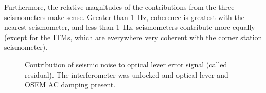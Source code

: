 Furthermore, the relative magnitudes of the contributions from the
three seismometers make sense. Greater than 1~Hz, coherence is
greatest with the nearest seismometer, and less than 1~Hz,
seismometers contribute more equally (except for the ITMs, which are
everywhere very coherent with the corner station seismometer).

\begin{figure}
\begin{centering}
\caption[Contribution of seismic noise to optical lever error
signal]{Contribution of seismic noise to optical lever error signal
  (called residual). The interferometer was unlocked and optical lever
  and OSEM AC damping present.}
\label{fig:OLcontributions}
\end{centering}
\end{figure}

